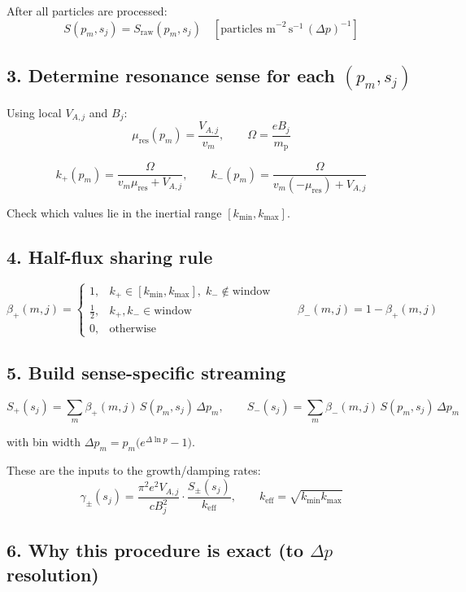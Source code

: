 {After all particles are processed:
\[
S(p_m, s_j) = S_{\mathrm{raw}}(p_m, s_j)
\quad \left[\text{particles m}^{-2} \, \text{s}^{-1} \, (\Delta p)^{-1}\right]
\]

\subsection*{3. Determine resonance sense for each $(p_m, s_j)$}

Using local $V_{A,j}$ and $B_j$:
\[
\mu_{\mathrm{res}}(p_m) = \frac{V_{A,j}}{v_m},
\qquad
\Omega = \frac{e B_j}{m_{\mathrm p}}
\]

\[
k_{+}(p_m) = \frac{\Omega}{v_m \mu_{\mathrm{res}} + V_{A,j}},
\qquad
k_{-}(p_m) = \frac{\Omega}{v_m (-\mu_{\mathrm{res}}) + V_{A,j}}
\]

Check which values lie in the inertial range $[k_{\min}, k_{\max}]$.

\subsection*{4. Half-flux sharing rule}

\[
\beta_{+}(m,j)
=
\begin{cases}
1, & k_{+} \in [k_{\min}, k_{\max}],\; k_{-} \notin \text{window} \\[4pt]
\frac{1}{2}, & k_{+}, k_{-} \in \text{window} \\[4pt]
0, & \text{otherwise}
\end{cases}
\qquad
\beta_{-}(m,j) = 1 - \beta_{+}(m,j)
\]

\subsection*{5. Build sense-specific streaming}

\begin{equation}
\boxed{
S_{+}(s_j) =
  \sum_m \beta_{+}(m,j) \, S(p_m, s_j) \, \Delta p_m,
\qquad
S_{-}(s_j) =
  \sum_m \beta_{-}(m,j) \, S(p_m, s_j) \, \Delta p_m
}
\tag{2}
\end{equation}

with bin width $\Delta p_m = p_m \bigl(e^{\Delta \ln p} - 1\bigr)$.

These are the inputs to the growth/damping rates:
\[
\boxed{
\gamma_{\pm}(s_j)
= \frac{\pi^2 e^2 V_{A,j}}{c B_j^2}
  \cdot \frac{S_{\pm}(s_j)}{k_{\mathrm{eff}}},
\qquad
k_{\mathrm{eff}} = \sqrt{k_{\min} k_{\max}}
}
\]

\subsection*{6. Why this procedure is exact (to $\Delta p$ resolution)}

}
